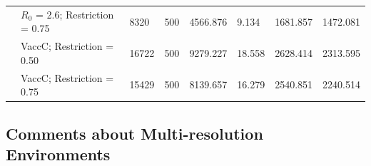 \documentclass[pdflatex,sn-mathphys-num]{sn-jnl}%
\theoremstyle{thmstyleone}%
\theoremstyle{thmstyletwo}%
\theoremstyle{thmstylethree}%
\begin{document}
\begin{table}[ht]
{\begin{tabular}{@{}clllllll@{}}
                                                                                                                       & $R_0$ = 2.6; Restriction = 0.75      & 8320                                                                         & 500                                                                            & 4566.876                                                                       & 9.134                                                                            & 1681.857                                                                                & 1472.081                                                                                 \\
                                                                                                                       & VaccC; Restriction = 0.50         & 16722                                                                        & 500                                                                            & 9279.227                                                                       & 18.558                                                                           & 2628.414                                                                                & 2313.595                                                                                 \\
                                                                                                                       & VaccC; Restriction = 0.75         & 15429                                                                        & 500                                                                            & 8139.657                                                                       & 16.279                                                                           & 2540.851                                                                                & 2240.514                                                                                 \\ \bottomrule
\end{tabular}
} %
\end{table}

\subsection{Comments about Multi-resolution Environments}
\label{sec:comments}
\end{document}
